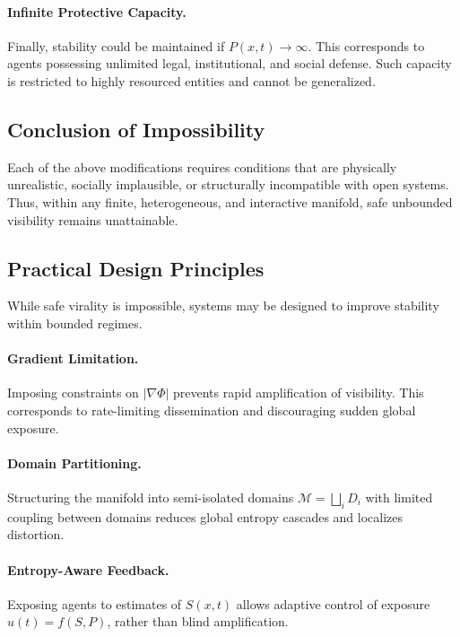 \documentclass[12pt,a4paper]{article}
\begin{document}
\paragraph{Infinite Protective Capacity.}
Finally, stability could be maintained if $P(x,t) \rightarrow \infty$. This corresponds to agents possessing unlimited legal, institutional, and social defense. Such capacity is restricted to highly resourced entities and cannot be generalized.

\subsection{Conclusion of Impossibility}

Each of the above modifications requires conditions that are physically unrealistic, socially implausible, or structurally incompatible with open systems. Thus, within any finite, heterogeneous, and interactive manifold, safe unbounded visibility remains unattainable.

\subsection{Practical Design Principles}

While safe virality is impossible, systems may be designed to improve stability within bounded regimes.

\paragraph{Gradient Limitation.}
Imposing constraints on $|\nabla \Phi|$ prevents rapid amplification of visibility. This corresponds to rate-limiting dissemination and discouraging sudden global exposure.

\paragraph{Domain Partitioning.}
Structuring the manifold into semi-isolated domains $\mathcal{M} = \bigsqcup_i D_i$ with limited coupling between domains reduces global entropy cascades and localizes distortion.

\paragraph{Entropy-Aware Feedback.}
Exposing agents to estimates of $S(x,t)$ allows adaptive control of exposure $u(t) = f(S, P)$, rather than blind amplification.
\end{document}
